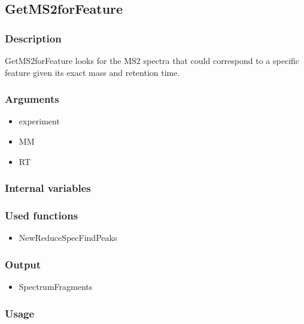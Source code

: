 \subsection{GetMS2forFeature}
\subsubsection{Description}
GetMS2forFeature looks for the MS2 spectra that could correspond to a specific feature given its exact mass and retention time.
\subsubsection{Arguments}
\begin{itemize}
\item experiment
\item MM
\item RT
\end{itemize}
\subsubsection{Internal variables}
\subsubsection{Used functions}
\begin{itemize}
\item NewReduceSpecFindPeaks
\end{itemize}
\subsubsection{Output}
\begin{itemize}
\item SpectrumFragments %
\end{itemize}
\subsubsection{Usage}


